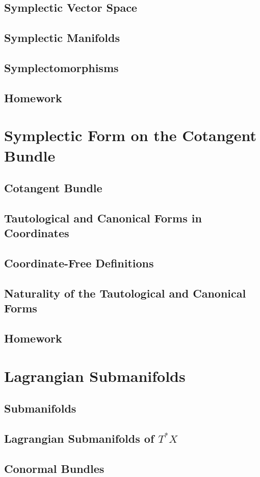 \documentclass[4paper]{article}
\begin{document}
\subsection{Symplectic Vector Space}
\subsection{Symplectic Manifolds}
\subsection{Symplectomorphisms}
\subsection{Homework}
\section{Symplectic Form on the Cotangent Bundle}
\subsection{Cotangent Bundle}
\subsection{Tautological and Canonical Forms in Coordinates}
\subsection{Coordinate-Free Definitions}
\subsection{Naturality of the Tautological and Canonical Forms}
\subsection{Homework} 
\section{Lagrangian Submanifolds}
\subsection{Submanifolds}
\subsection{Lagrangian Submanifolds of $ T^*X $}
\subsection{Conormal Bundles}
\end{document}
